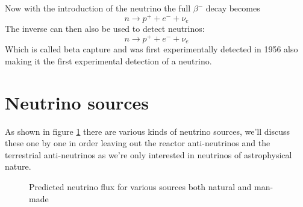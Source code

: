 \documentclass[11pt,a4paper,faculty=we,language=en,doctype=report]{cls/ugent-doc}
\begin{document}
Now with the introduction of the neutrino the full $\beta^-$ decay
becomes
\begin{equation}
	n \rightarrow p^+ + e^- + \nu_e
\end{equation}
The inverse can then also be used to detect neutrinos:
\begin{equation}
	n \rightarrow p^+ + e^- + \nu_e
\end{equation}
Which is called beta capture and was first experimentally detected in 1956
\cite{BetaCapture} also making it the first experimental detection of a
neutrino.
\section{Neutrino sources}
As shown in figure \ref{figure:Neutrino fluxes} there are various kinds of neutrino sources,
we'll discuss these one by one in order leaving out the reactor anti-neutrinos and the terrestrial anti-neutrinos
as we're only interested in neutrinos of astrophysical nature.
\begin{figure}
	\centering
	\caption{Predicted neutrino flux for various sources both natural and man-made}
	\label{figure:Neutrino fluxes}
\end{figure}
\end{document}
